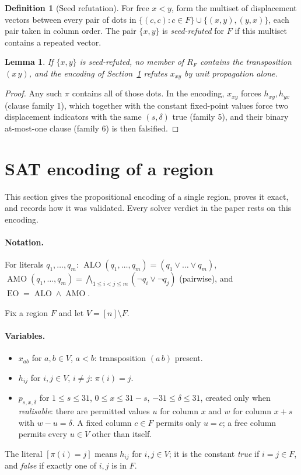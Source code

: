 \documentclass[11pt,a4paper,oneside]{report}
\newtheorem{lemma}[theorem]{Lemma}
\theoremstyle{definition}
\newtheorem{definition}[theorem]{Definition}
\newcommand{\ALO}{\operatorname{ALO}}
\newcommand{\AMO}{\operatorname{AMO}}
\newcommand{\EO}{\operatorname{EO}}
\begin{document}
\begin{definition}[Seed refutation]\label{p8-def:seed}
For free $x<y$, form the multiset of displacement vectors between every pair of dots in
$\{(c,c):c\in F\}\cup\{(x,y),(y,x)\}$, each pair taken in column order. The pair $\{x,y\}$ is
\emph{seed-refuted} for $F$ if this multiset contains a repeated vector.
\end{definition}

\begin{lemma}\label{p8-lem:seed}
If $\{x,y\}$ is seed-refuted, no member of $R_F$ contains the transposition $(x\,y)$, and the
encoding of Section~\ref{p8-sec:encoding} refutes $x_{xy}$ by unit propagation alone.
\end{lemma}
\begin{proof}
Any such $\pi$ contains all of those dots. In the encoding, $x_{xy}$ forces $h_{xy},h_{yx}$
(clause family 1), which together with the constant fixed-point values force two
displacement indicators with the same $(s,\delta)$ true (family 5), and their binary
at-most-one clause (family 6) is then falsified.
\end{proof}

\section{SAT encoding of a region}\label{p8-sec:encoding}
This section gives the propositional encoding of a single region, proves it exact, and records how it was validated. Every solver verdict in the paper rests on this encoding.


\paragraph{Notation.} For literals $q_1,\dots,q_m$:
$\ALO(q_1,\dots,q_m)=(q_1\vee\dots\vee q_m)$,
$\AMO(q_1,\dots,q_m)=\bigwedge_{1\le i<j\le m}(\neg q_i\vee\neg q_j)$ (pairwise), and
$\EO=\ALO\wedge\AMO$.

Fix a region $F$ and let $V=[n]\setminus F$.

\paragraph{Variables.}
\begin{itemize}
\item $x_{ab}$ for $a,b\in V$, $a<b$: transposition $(a\,b)$ present.
\item $h_{ij}$ for $i,j\in V$, $i\ne j$: $\pi(i)=j$.
\item $p_{s,x,\delta}$ for $1\le s\le 31$, $0\le x\le 31-s$, $-31\le\delta\le 31$, created only
when \emph{realisable}: there are permitted values $u$ for column $x$ and $w$ for column $x+s$
with $w-u=\delta$. A fixed column $c\in F$ permits only $u=c$; a free column permits every
$u\in V$ other than itself.
\end{itemize}
The literal $[\pi(i)=j]$ means $h_{ij}$ for $i,j\in V$; it is the constant \emph{true} if
$i=j\in F$, and \emph{false} if exactly one of $i,j$ is in $F$.
\end{document}
